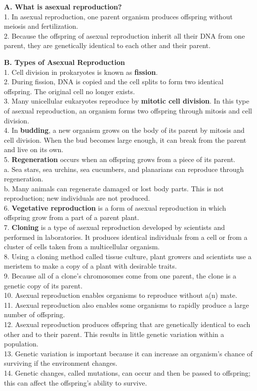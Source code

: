 \documentclass[
]{book}
\begin{document}
\textbf{A. What is asexual reproduction?}\\
1. In {asexual reproduction}, one parent organism produces offspring without meiosis and fertilization.\\
2. Because the offspring of asexual reproduction inherit all their DNA from one parent, they are genetically {identical} to each other and their parent.

\textbf{B. Types of Asexual Reproduction}\\
1. Cell division in prokaryotes is known as {\textbf{fission}}.\\
2. During fission, DNA is {copied} and the cell splits to form two identical offspring. The original cell no longer exists.\\
3. Many unicellular {eukaryotes} reproduce by {\textbf{mitotic cell division}}. In this type of asexual reproduction, an organism forms two offspring through mitosis and {cell division}.\\
4. In {\textbf{budding}}, a new organism grows on the body of its parent by mitosis and cell division. When the bud becomes large enough, it can break from the parent and live on its own.\\
5. {\textbf{Regeneration}} occurs when an offspring grows from a piece of its parent.\\
a. Sea stars, sea urchins, sea cucumbers, and planarians can {reproduce} through regeneration.\\
b. Many animals can {regenerate} damaged or lost body parts. This is not reproduction; {new individuals} are not produced.\\
6. {\textbf{Vegetative reproduction}} is a form of asexual reproduction in which offspring grow from a part of a parent plant.\\
7. {\textbf{Cloning}} is a type of asexual reproduction developed by scientists and performed in laboratories. It produces {identical} individuals from a cell or from a cluster of cells taken from a multicellular organism.\\
8. Using a cloning method called {tissue culture}, plant growers and scientists use a meristem to make a copy of a plant with desirable traits.\\
9. Because all of a clone's {chromosomes} come from one parent, the clone is a genetic copy of its parent.\\
10. Asexual reproduction enables organisms to reproduce without a(n) {mate}.\\
11. Asexual reproduction also enables some organisms to rapidly produce a large number of {offspring}.\\
12. Asexual reproduction produces offspring that are genetically identical to each other and to their parent. This results in little genetic {variation} within a population.\\
13. Genetic variation is important because it can increase an organism's chance of {surviving} if the environment changes.\\
14. Genetic changes, called {mutations}, can occur and then be passed to offspring; this can affect the offspring's ability to survive.
\end{document}
